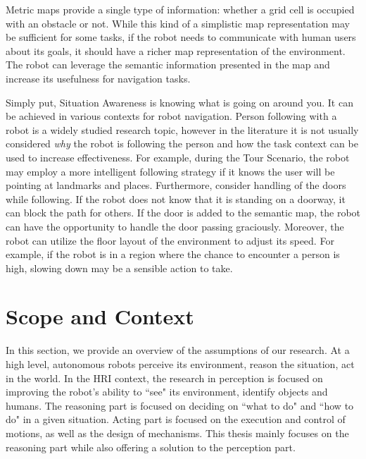 Metric maps provide a single type of information: whether a grid cell is occupied with an obstacle or not. While this kind of a simplistic map representation may be sufficient for some tasks, if the robot needs to communicate with human users about its goals, it should have a richer map representation of the environment. The robot can leverage the semantic information presented in the map and increase its usefulness for navigation tasks.


Simply put, Situation Awareness is knowing what is going on around you. It can be achieved in various contexts for robot navigation. Person following with a robot is a widely studied research topic, however in the literature it is not usually considered \textit{why} the robot is following the person and how the task context can be used to increase effectiveness. For example, during the Tour Scenario, the robot may employ a more intelligent following strategy if it knows the user will be pointing at landmarks and places. Furthermore, consider handling of the doors while following. If the robot does not know that it is standing on a doorway, it can block the path for others. If the door is added to the semantic map, the robot can have the opportunity to handle the door passing graciously. Moreover, the robot can utilize the floor layout of the environment to adjust its speed. For example, if the robot is in a region where the chance to encounter a person is high, slowing down may be a sensible action to take.






\section{Scope and Context}

In this section, we provide an overview of the assumptions of our research.  At a high level, autonomous robots perceive its environment, reason the situation, act in the world. In the HRI context, the research in perception is focused on improving the robot's ability to ``see" its environment, identify objects and humans. The reasoning part is focused on deciding on ``what to do" and ``how to do" in a given situation. Acting part is focused on the execution and control of motions, as well as the design of mechanisms. This thesis mainly focuses on the reasoning part while also offering a solution to the perception part.

